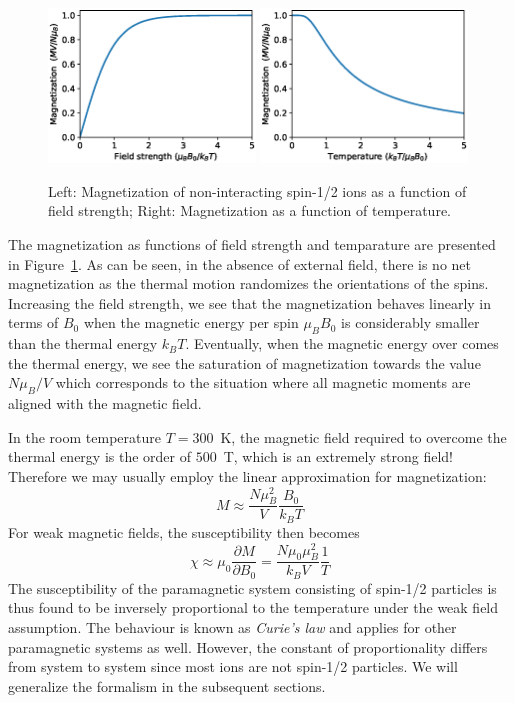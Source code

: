 \begin{figure}
\centering
\includegraphics[width=0.49\textwidth]{magnetism/figures/spin_magnetization_a}
\includegraphics[width=0.49\textwidth]{magnetism/figures/spin_magnetization_b}
\caption{Left: Magnetization of non-interacting spin-1/2 ions as a function of field strength; Right: Magnetization as a function of temperature.\label{fig:spin_magnetization}}
\end{figure}

The magnetization as functions of field strength and temparature are presented in Figure~\ref{fig:spin_magnetization}. As can be seen, in the absence of external field, there is no net magnetization as the thermal motion randomizes the orientations of the spins. Increasing the field strength, we see that the magnetization behaves linearly in terms of $B_0$ when the magnetic energy per spin $\mu_B B_0$ is considerably smaller than the thermal energy $k_B T$. Eventually, when the magnetic energy over comes the thermal energy, we see the saturation of magnetization towards the value $N\mu_B/V$ which corresponds to the situation where all magnetic moments are aligned with the magnetic field. 

In the room temperature $T=300$~K, the magnetic field required to overcome the thermal energy is the order of $500$~T, which is an extremely strong field! Therefore we may usually employ the linear approximation for magnetization:
\begin{equation}
M \approx \frac{N \mu_B^2}{V}\frac{B_0}{k_B T}
\end{equation}  
For weak magnetic fields, the susceptibility then becomes
\begin{equation}
\chi \approx \mu_0 \frac{\partial M}{\partial B_0} = \frac{N\mu_0 \mu_B^2}{k_B V} \frac{1}{T}
\end{equation}
The susceptibility of the paramagnetic system consisting of spin-1/2 particles is thus found to be inversely proportional to the temperature under the weak field assumption. The behaviour is known as \emph{Curie's law} and applies for other paramagnetic systems as well. However, the constant of proportionality differs from system to system since most ions are not spin-1/2 particles. We will generalize the formalism in the subsequent sections.


